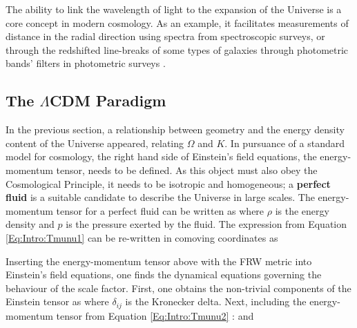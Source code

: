 \qquad The ability to link the wavelength of light to the expansion of the Universe is a core concept in modern cosmology. As an example, it facilitates measurements of distance in the radial direction using spectra from spectroscopic surveys, or through the redshifted line-breaks of some types of galaxies through photometric bands' filters in photometric surveys \citep{AbdallaPhotoZ2011,2018-redshift}.


\subsection{The $\Lambda$CDM Paradigm}\label{Sec:Intro:LCDM}
In the previous section, a relationship between geometry and the energy density content of the Universe appeared, relating $\Omega$ and $K$. In pursuance of a standard model for cosmology, the right hand side of Einstein's field equations, the energy-momentum tensor, needs to be defined. As this object must also obey the Cosmological Principle, it needs to be isotropic and homogeneous; a \textbf{perfect fluid} is a suitable candidate to describe the Universe in large scales. The energy-momentum tensor for a perfect fluid can be written as
where $\rho$ is the energy density and $p$ is the pressure exerted by the fluid. The expression from Equation \eqref{Eq:Intro:Tmunu1} can be re-written in comoving coordinates as

\qquad Inserting the energy-momentum tensor above with the FRW metric into Einstein's field equations, one finds the dynamical equations governing the behaviour of the scale factor. First, one obtains the non-trivial components of the Einstein tensor as
where $\delta_{ij}$ is the Kronecker delta. Next, including the energy-momentum tensor from Equation \eqref{Eq:Intro:Tmunu2} \citep{1922Friedmann,1924FriedmannCurvature}:
and

